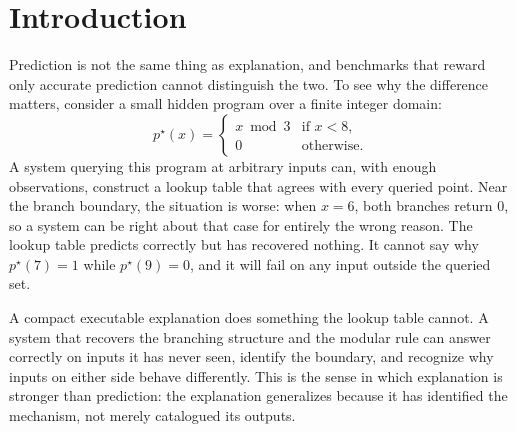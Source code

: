 \documentclass[11pt]{article}
\theoremstyle{remark}
\begin{document}
\begin{abstract}
The paper further identifies three levels at which the theory operates: the ideal theory, which is variationally specified at every finite history, supplemented by conditional asymptotic results in the realizable interactive case, and still incomputable in the Solomonoff sense; a behavioral proxy, which evaluates systems by outputs consistent with free energy minimization without requiring access to internal belief states; and an open mechanistic challenge, which specifies the internal quantities and verification tests a system would need to expose in order to be evaluated against the ideal theory directly rather than behaviorally. We state the mechanistic challenge as a concrete compliance protocol rather than as an aspiration.
\end{abstract}

\section{Introduction}

Prediction is not the same thing as explanation, and benchmarks that reward only accurate prediction cannot distinguish the two. To see why the difference matters, consider a small hidden program over a finite integer domain:
\[
p^\star(x) =
\begin{cases}
x \bmod 3 & \text{if } x < 8, \\
0 & \text{otherwise.}
\end{cases}
\]
A system querying this program at arbitrary inputs can, with enough observations, construct a lookup table that agrees with every queried point. Near the branch boundary, the situation is worse: when \(x = 6\), both branches return \(0\), so a system can be right about that case for entirely the wrong reason. The lookup table predicts correctly but has recovered nothing. It cannot say why \(p^\star(7) = 1\) while \(p^\star(9) = 0\), and it will fail on any input outside the queried set.

A compact executable explanation does something the lookup table cannot. A system that recovers the branching structure and the modular rule can answer correctly on inputs it has never seen, identify the boundary, and recognize why inputs on either side behave differently. This is the sense in which explanation is stronger than prediction: the explanation generalizes because it has identified the mechanism, not merely catalogued its outputs.
\end{document}
